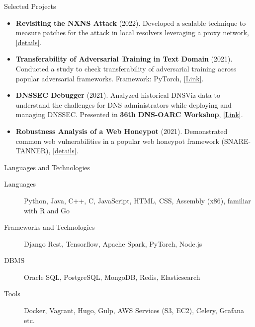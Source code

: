 \documentclass[]{mcdowellcv}
\begin{document}
	\begin{cvsection}{Selected Projects}
		\begin{cvsubsection}{}{}{}
			\begin{itemize}
				\item \textbf{Revisiting the NXNS Attack} (2022). Developed a scalable technique to measure patches for the attack in local resolvers leveraging a proxy network, \href{https://drive.google.com/file/d/1kuTSIHuNUYxmIKbR6MsSg3znMqx55mCP/view}{[details]}.
				\item \textbf{Transferability of Adversarial Training in Text Domain} (2021). Conducted a study to check transferability of adversarial training across popular adversarial frameworks. Framework: PyTorch, \href{https://github.com/Ashiq5/AdvTrainingExperiment}{[Link]}.
				\item \textbf{DNSSEC Debugger} (2021). Analyzed historical DNSViz data to understand the challenges for DNS administrators while deploying and managing DNSSEC. Presented in \textbf{36th DNS-OARC Workshop}, \href{https://indico.dns-oarc.net/event/40/contributions/891/attachments/857/1555/DNS-OARC-final.pdf}{[Link]}.
				\item \textbf{Robustness Analysis of a Web Honeypot} (2021). Demonstrated common web vulnerabilities in a popular web honeypot framework (SNARE-TANNER), \href{https://drive.google.com/file/d/1-FuDy-8xTE2TCRVV2RDuusnhAiLdgMeO/view?usp=sharing}{[details]}.
			\end{itemize}
		\end{cvsubsection}
	\end{cvsection}

	\begin{cvsection}{Languages and Technologies}
		\begin{cvsubsection}{}{}{}
			\begin{description}
				\item[Languages] Python, Java, C++, C, JavaScript, HTML, CSS, Assembly (x86), familiar with R and Go
				\item[Frameworks and Technologies] Django Rest, Tensorflow, Apache Spark, PyTorch, Node.js
				\item[DBMS] Oracle SQL, PostgreSQL, MongoDB, Redis, Elasticsearch
				\item[Tools] Docker, Vagrant, Hugo, Gulp, AWS Services (S3, EC2), Celery, Grafana etc. %
			\end{description}
		\end{cvsubsection}
	\end{cvsection}
\end{document}
